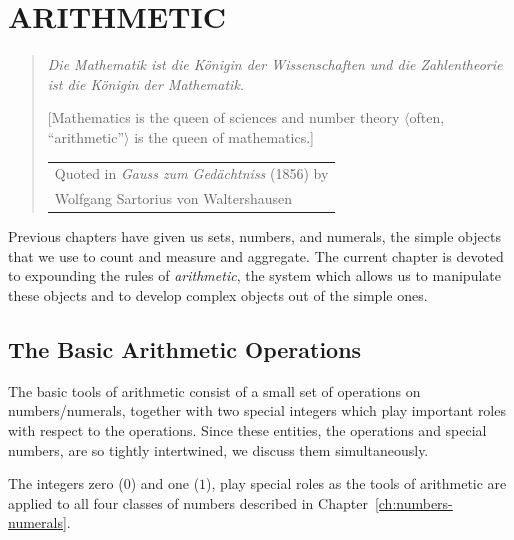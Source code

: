 
\chapter{ARITHMETIC}
\label{ch:arithmetic}


\hfill
\begin{quote}
{\it Die Mathematik ist die K\"{o}nigin der Wissenschaften und die
Zahlentheorie ist die K\"{o}nigin der Mathematik.}

[Mathematics is the queen of sciences and number theory
  $\langle$often, ``arithmetic''$\rangle$ is the queen of
  mathematics.]

\hfill
\begin{tabular}{l}
Quoted in {\it Gauss zum Gedächtniss} (1856) by \\
Wolfgang Sartorius von Waltershausen 
\end{tabular}
\end{quote}

\bigskip

Previous chapters have given us sets, numbers, and numerals, the
simple objects that we use to count and measure and aggregate.  The
current chapter is devoted to expounding the rules of {\em
  arithmetic}, the system which allows us to manipulate these objects
and to develop complex objects out of the simple ones.

\section{The Basic Arithmetic Operations}
\label{sec:Arithmetic-Tools}

The basic tools of arithmetic consist of a small set of operations on
numbers/numerals, together with two special integers which play
important roles with respect to the operations.  Since these entities,
the operations and special numbers, are so tightly intertwined, we
discuss them simultaneously.

\smallskip

The integers zero ($0$)
and one ($1$),
play special roles as the tools of arithmetic are applied to all four
classes of numbers described in Chapter~\ref{ch:numbers-numerals}.

\smallskip

